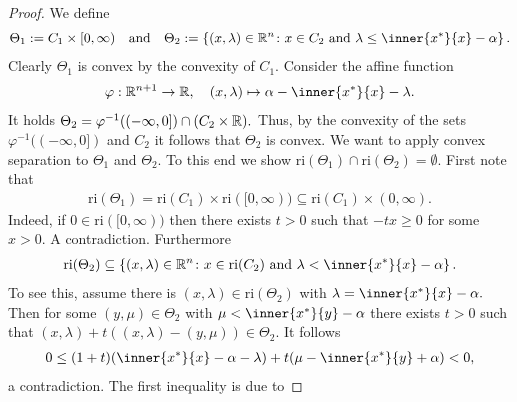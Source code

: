 \begin{proof}
  \emph{\cite[Theorem~4.23]{Mordukhovich2022}}
  We define
  \begin{gather}
    \Theta_1
    :=
    C_1 \times [0,\infty)
    \quad
    \text{and}
    \quad
    \Theta_2
    :=
    \left\{ 
      (x,\lambda)\in \R^n
      \colon
      x \in C_2
      \ 
      \text{and}
      \ 
      \lambda
      \le
      \inner{x^*}{x} - \alpha
    \right\}.
  \end{gather}
  Clearly $\Theta_1$ is convex by the convexity of $C_1.$
  Consider the affine function
  \begin{gather}
    \varphi:
    \R^{n+1} \to \R
    ,
    \quad
    (x,\lambda)
    \mapsto
    \alpha - \inner{x^*}{x} - \lambda.
  \end{gather}
  It holds 
  $
    \Theta_2
    =
    \varphi^{-1}((-\infty,0])
    \cap
    (
      C_2\times \mathbb{R}
    )
    .
  $
  Thus, by the convexity of the sets
  $
    \varphi^{-1}((-\infty,0])
  $
  and $C_2$
  it follows that $\Theta_2$ is convex.
  We want to apply convex separation to 
  $\Theta_1$ and $\Theta_2$.
  To this end we show 
  $\mathrm{ri}(\Theta_1)\cap\mathrm{ri}(\Theta_2)=\emptyset.$
  First note that
  \begin{gather}
    \mathrm{ri}(\Theta_1)
    =
    \mathrm{ri}(C_1)
    \times
    \mathrm{ri}([0,\infty))
    \subseteq
    \mathrm{ri}(C_1)
    \times
    (0,\infty).
  \end{gather}
  Indeed, if 
  $
    0\in
    \mathrm{ri}([0,\infty))
  $
  then there exists $t>0$ such that $-tx\ge 0$ for some $x>0.$ A contradiction.
  Furthermore
\begin{gather}
  \mathrm{ri}(\Theta_2)
  \subseteq
    \left\{ 
      (x,\lambda)\in \R^n
      \colon
      x \in \mathrm{ri}(C_2) 
      \ 
      \text{and}
      \ 
      \lambda
      <
      \inner{x^*}{x} - \alpha
    \right\}.
\end{gather}
To see this, assume there is 
$
(x,\lambda)
\in \mathrm{ri}(\Theta_2)
$
with
$
      \lambda
      =
      \inner{x^*}{x} - \alpha
      .
$
Then for some 
$
  (y,\mu)
  \in \Theta_2
$
with
$
      \mu    
      <
      \inner{x^*}{y} - \alpha
$
there exists $t>0$ such that 
$
  (x,\lambda)
  +
  t
  (
  (x,\lambda)
  -
  (y,\mu)
  )
  \in \Theta_2.
$
It follows
\begin{align}
  0
  \le
  (1+t)(\inner{x^*}{x}-\alpha -\lambda)
  +
  t
  (
    \mu 
    -\inner{x^*}{y}
    +
    \alpha
  )
  <0
,
\end{align}
a contradiction.
The first inequality is due to 

\end{proof}
